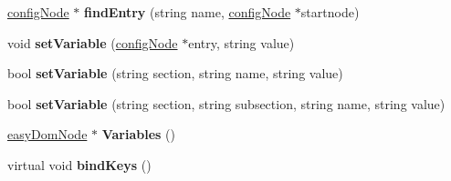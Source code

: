 \begin{DoxyCompactItemize}
\item 
\hyperlink{classconfigNode}{config\+Node} $\ast$ {\bfseries find\+Entry} (string name, \hyperlink{classconfigNode}{config\+Node} $\ast$startnode)\hypertarget{classVegaConfig_ac42983588449284b5bac4b72daab2c8d}{}\label{classVegaConfig_ac42983588449284b5bac4b72daab2c8d}

\item 
void {\bfseries set\+Variable} (\hyperlink{classconfigNode}{config\+Node} $\ast$entry, string value)\hypertarget{classVegaConfig_ad93a452d691a9e052434867154580220}{}\label{classVegaConfig_ad93a452d691a9e052434867154580220}

\item 
bool {\bfseries set\+Variable} (string section, string name, string value)\hypertarget{classVegaConfig_a97ac748fff002ed6464313a34fc30ace}{}\label{classVegaConfig_a97ac748fff002ed6464313a34fc30ace}

\item 
bool {\bfseries set\+Variable} (string section, string subsection, string name, string value)\hypertarget{classVegaConfig_a306e73cd17fb1e671c900871e2fce324}{}\label{classVegaConfig_a306e73cd17fb1e671c900871e2fce324}

\item 
\hyperlink{classeasyDomNode}{easy\+Dom\+Node} $\ast$ {\bfseries Variables} ()\hypertarget{classVegaConfig_ae3c267ae9b1e801762b2aba480206f38}{}\label{classVegaConfig_ae3c267ae9b1e801762b2aba480206f38}

\item 
virtual void {\bfseries bind\+Keys} ()\hypertarget{classVegaConfig_aa8895dbeaa521e5fc3747b4b7ab86108}{}\label{classVegaConfig_aa8895dbeaa521e5fc3747b4b7ab86108}

\end{DoxyCompactItemize}
